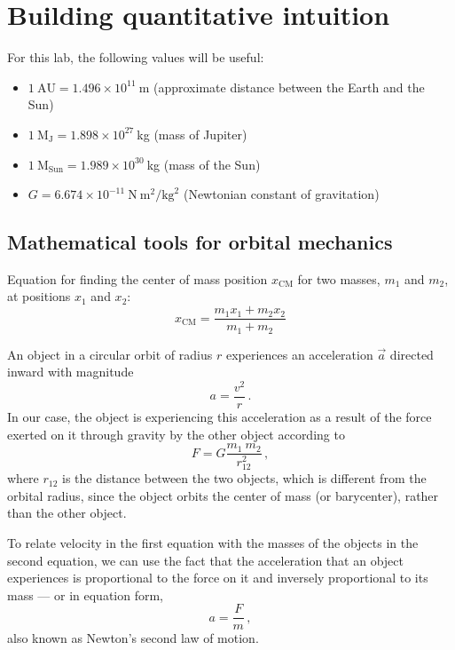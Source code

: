 \section{Building quantitative intuition}

For this lab, the following values will be useful:
\begin{itemize}
	\item $1\:\textrm{AU} = 1.496 \times 10^{11}\:$m (approximate distance between the Earth and the Sun)
	
	\item $1\:\textrm{M}_\textrm{J} = 1.898 \times 10^{27}\:$kg (mass of Jupiter)
	
	\item $1\:\textrm{M}_\textrm{Sun} = 1.989 \times 10^{30}\:$kg (mass of the Sun)
	
	\item $G = 6.674 \times 10^{-11}\:\mathrm{N}\:\mathrm{m}^2/\mathrm{kg}^2$ (Newtonian constant of gravitation)
\end{itemize}

\subsection{Mathematical tools for orbital mechanics}

Equation for finding the center of mass position $x_\mathrm{CM}$ for two masses, $m_1$ and $m_2$, at positions $x_1$ and $x_2$:
\begin{equation}
 x_\mathrm{CM} = \frac{m_1 x_1 + m_2 x_2}{m_1 + m_2}
\end{equation}

An object in a circular orbit of radius $r$ experiences an acceleration $\vec{a}$ directed inward with magnitude
\begin{equation}\label{rv:eq:circular}
 a = \frac{v^2}{r} \,.
\end{equation}
In our case, the object is experiencing this acceleration as a result of the force exerted on it through gravity by the other object according to
\begin{equation}\label{rv:eq:grav}
 F = G \frac{m_1 \: m_2}{r_{12}^2} \,,
\end{equation}
where $r_{12}$ is the distance between the two objects, which is different from the orbital radius, since the object orbits the center of mass (or barycenter), rather than the other object.

To relate velocity in the first equation with the masses of the objects in the second equation, we can use the fact that the acceleration that an object experiences is proportional to the force on it and inversely proportional to its mass --- or in equation form,
\begin{equation}\label{rv:eq:n2l}
 a = \frac{F}{m} \,,
\end{equation}
also known as Newton's second law of motion.

